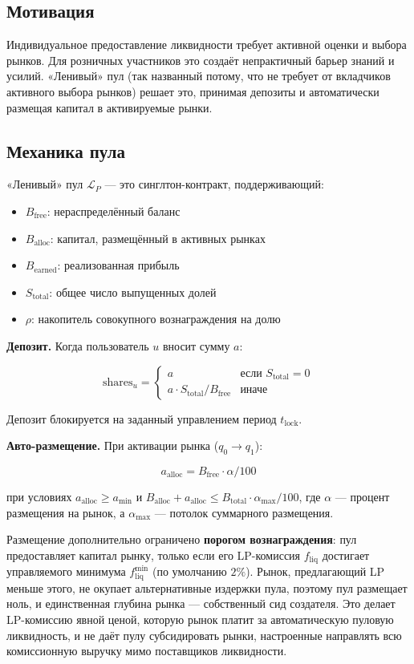 \documentclass{ledger}
\theoremstyle{plain}
\theoremstyle{remark}
\begin{document}
\subsection{Мотивация}

Индивидуальное предоставление ликвидности требует активной оценки и выбора рынков.
Для розничных участников это создаёт непрактичный барьер знаний и усилий.
«Ленивый» пул (так названный потому, что не требует от вкладчиков активного выбора
рынков) решает это, принимая депозиты и автоматически размещая капитал в
активируемые рынки.

\subsection{Механика пула}\label{sec:poolmech}

«Ленивый» пул $\mathcal{L}_P$ --- это синглтон-контракт, поддерживающий:
\begin{itemize}
  \item $B_{\text{free}}$: нераспределённый баланс
  \item $B_{\text{alloc}}$: капитал, размещённый в активных рынках
  \item $B_{\text{earned}}$: реализованная прибыль
  \item $S_{\text{total}}$: общее число выпущенных долей
  \item $\rho$: накопитель совокупного вознаграждения на долю
\end{itemize}

\textbf{Депозит.} Когда пользователь $u$ вносит сумму $a$:

\[
\text{shares}_u = \begin{cases} a & \text{если } S_{\text{total}} = 0 \\
a \cdot S_{\text{total}} / B_{\text{free}} & \text{иначе} \end{cases}
\]

Депозит блокируется на заданный управлением период $t_{\text{lock}}$.

\textbf{Авто-размещение.} При активации рынка ($q_0 \rightarrow q_1$):

\[
a_{\text{alloc}} = B_{\text{free}} \cdot \alpha / 100
\]

при условиях $a_{\text{alloc}} \geq a_{\min}$ и $B_{\text{alloc}} +
a_{\text{alloc}} \leq B_{\text{total}} \cdot \alpha_{\max} / 100$, где $\alpha$ ---
процент размещения на рынок, а $\alpha_{\max}$ --- потолок суммарного размещения.

Размещение дополнительно ограничено \textbf{порогом вознаграждения}: пул
предоставляет капитал рынку, только если его LP-комиссия $f_{\text{liq}}$ достигает
управляемого минимума $f_{\text{liq}}^{\min}$ (по умолчанию $2\%$). Рынок,
предлагающий LP меньше этого, не окупает альтернативные издержки пула, поэтому пул
размещает ноль, и единственная глубина рынка --- собственный сид создателя. Это
делает LP-комиссию явной ценой, которую рынок платит за автоматическую пуловую
ликвидность, и не даёт пулу субсидировать рынки, настроенные направлять всю
комиссионную выручку мимо поставщиков ликвидности.
\end{document}
